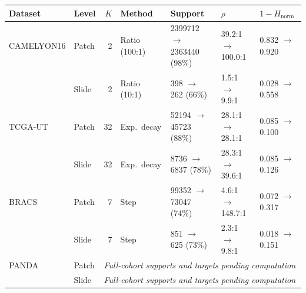 \begin{tabular}{llrllll}
\toprule
Dataset & Level & $K$ & Method & Support & $\rho$ & $1-H_{\mathrm{norm}}$\\
\midrule
CAMELYON16 & Patch & 2 & Ratio (100:1) & \num{2399712} $\to$ \num{2363440} (98\%) & 39.2:1 $\to$ 100.0:1 & \num{0.832} $\to$ \num{0.920}\\
 & Slide & 2 & Ratio (10:1) & \num{398} $\to$ \num{262} (66\%) & 1.5:1 $\to$ 9.9:1 & \num{0.028} $\to$ \num{0.558}\\
\addlinespace
TCGA-UT & Patch & 32 & Exp.\ decay & \num{52194} $\to$ \num{45723} (88\%) & 28.1:1 $\to$ 28.1:1 & \num{0.085} $\to$ \num{0.100}\\
 & Slide & 32 & Exp.\ decay & \num{8736} $\to$ \num{6837} (78\%) & 28.3:1 $\to$ 39.6:1 & \num{0.085} $\to$ \num{0.126}\\
\addlinespace
BRACS & Patch & 7 & Step & \num{99352} $\to$ \num{73047} (74\%) & 4.6:1 $\to$ 148.7:1 & \num{0.072} $\to$ \num{0.317}\\
 & Slide & 7 & Step & \num{851} $\to$ \num{625} (73\%) & 2.3:1 $\to$ 9.8:1 & \num{0.018} $\to$ \num{0.151}\\
\addlinespace
PANDA & Patch & \multicolumn{5}{l}{\emph{Full-cohort supports and targets pending computation}}\\
 & Slide & \multicolumn{5}{l}{\emph{Full-cohort supports and targets pending computation}}\\
\bottomrule
\end{tabular}
